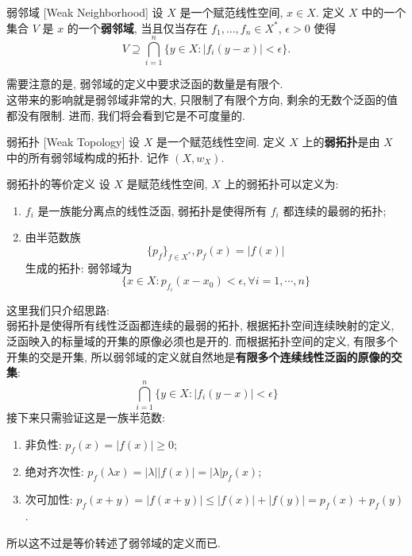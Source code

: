         \begin{dfn}
            {弱邻域}
            [Weak Neighborhood]
            设 \(X\) 是一个赋范线性空间, \(x\in X\). 定义 \(X\) 中的一个集合 \(V\) 是 \(x\) 的一个\textbf{弱邻域}, 当且仅当存在 \(f_1,\dots,f_n\in X^*\), \(\epsilon>0\) 使得
            \[V\supseteq\bigcap_{i=1}^n \{y\in X: |f_i(y-x)|<\epsilon\}.\]
        \end{dfn}

        \begin{rmk}
            需要注意的是, 弱邻域的定义中要求泛函的数量是有限个. \\
            这带来的影响就是弱邻域非常的大, 只限制了有限个方向, 剩余的无数个泛函的值都没有限制. 进而, 我们将会看到它是不可度量的.
        \end{rmk}

        \begin{dfn}
            {弱拓扑}
            [Weak Topology]
            设 \(X\) 是一个赋范线性空间. 定义 \(X\) 上的\textbf{弱拓扑}是由 \(X\) 中的所有弱邻域构成的拓扑. 记作 $(X,w_X)$.
        \end{dfn}

        \begin{thm}
            {弱拓扑的等价定义}
            设 \(X\) 是赋范线性空间, \(X\) 上的弱拓扑可以定义为:
            \begin{enumerate}[label=(\alph*)]
                \item \(f_i\) 是一族能分离点的线性泛函, 弱拓扑是使得所有 \(f_i\) 都连续的最弱的拓扑;
                \item 由半范数族 \[\{p_f\}_{f\in X^*}, p_f (x) = |f(x)|\] 生成的拓扑: 弱邻域为 \[\{x\in X: p_{f_i}(x-x_0) < \epsilon,\forall i = 1,\cdots,n\}\]
            \end{enumerate}
        \end{thm}

        \begin{prf}
            这里我们只介绍思路: \\
            弱拓扑是使得所有线性泛函都连续的最弱的拓扑, 根据拓扑空间连续映射的定义, 泛函映入的标量域的开集的原像必须也是开的. 而根据拓扑空间的定义, 有限多个开集的交是开集, 所以弱邻域的定义就自然地是\textbf{有限多个连续线性泛函的原像的交集}:
            \[\bigcap_{i=1}^n \{y\in X: |f_i(y-x)|<\epsilon\}\]
            接下来只需验证这是一族半范数:\begin{enumerate}[label=(\roman*)]
                \item 非负性: \(p_f(x)=|f(x)|\geq 0\);
                \item 绝对齐次性: \(p_f(\lambda x)=|\lambda||f(x)|=|\lambda|p_f(x)\);
                \item 次可加性: \(p_f(x+y)=|f(x+y)|\leq |f(x)|+|f(y)|=p_f(x)+p_f(y)\).
            \end{enumerate}
            所以这不过是等价转述了弱邻域的定义而已.
        \end{prf}

